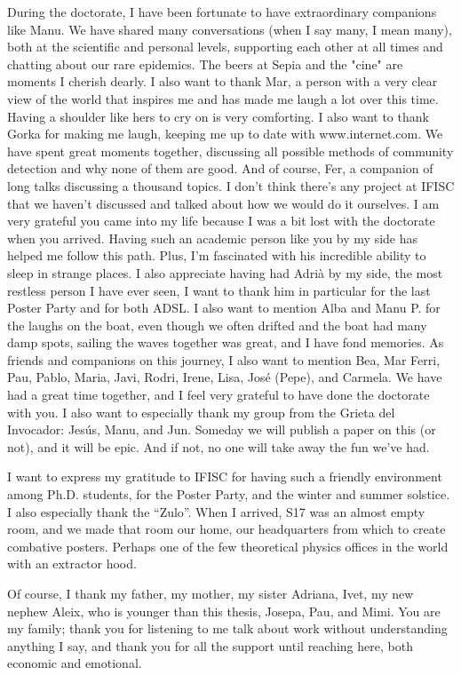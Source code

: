 During the doctorate, I have been fortunate to have extraordinary companions like Manu. We have shared many conversations (when I say many, I mean many), both at the scientific and personal levels, supporting each other at all times and chatting about our rare epidemics. The beers at Sepia and the "cine" are moments I cherish dearly. I also want to thank Mar, a person with a very clear view of the world that inspires me and has made me laugh a lot over this time. Having a shoulder like hers to cry on is very comforting. I also want to thank Gorka for making me laugh, keeping me up to date with www.internet.com. We have spent great moments together, discussing all possible methods of community detection and why none of them are good. And of course, Fer, a companion of long talks discussing a thousand topics. I don't think there's any project at IFISC that we haven't discussed and talked about how we would do it ourselves. I am very grateful you came into my life because I was a bit lost with the doctorate when you arrived. Having such an academic person like you by my side has helped me follow this path. Plus, I'm fascinated with his incredible ability to sleep in strange places. I also appreciate having had Adrià by my side, the most restless person I have ever seen, I want to thank him in particular for the last Poster Party and for both ADSL. I also want to mention Alba and Manu P. for the laughs on the boat, even though we often drifted and the boat had many damp spots, sailing the waves together was great, and I have fond memories. As friends and companions on this journey, I also want to mention Bea, Mar Ferri, Pau, Pablo, Maria, Javi, Rodri, Irene, Lisa, José (Pepe), and Carmela. We have had a great time together, and I feel very grateful to have done the doctorate with you. I also want to especially thank my group from the Grieta del Invocador: Jesús, Manu, and Jun. Someday we will publish a paper on this (or not), and it will be epic. And if not, no one will take away the fun we've had.

I want to express my gratitude to IFISC for having such a friendly environment among Ph.D. students, for the Poster Party, and the winter and summer solstice. I also especially thank the ``Zulo''. When I arrived, S17 was an almost empty room, and we made that room our home, our headquarters from which to create combative posters. Perhaps one of the few theoretical physics offices in the world with an extractor hood.

Of course, I thank my father, my mother, my sister Adriana, Ivet, my new nephew Aleix, who is younger than this thesis, Josepa, Pau, and Mimi. You are my family; thank you for listening to me talk about work without understanding anything I say, and thank you for all the support until reaching here, both economic and emotional.

